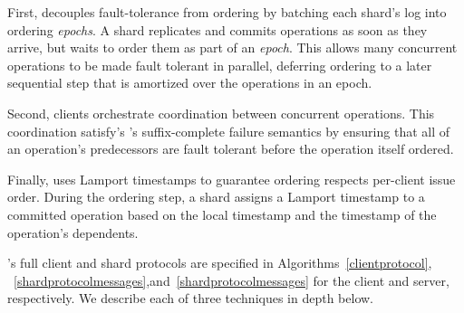 First, \sys{} decouples fault-tolerance from ordering by batching each shard's
log into ordering \textit{epochs}. A \sys{} shard replicates and commits
operations as soon as they arrive, but waits to order them as part of an
\textit{epoch}. This allows many concurrent operations to be made fault tolerant
in parallel, deferring ordering to a later sequential step that is amortized
over the operations in an epoch.

Second, \sys{} clients orchestrate coordination between concurrent operations.
This coordination satisfy's \MDL{}'s suffix-complete failure semantics by
ensuring that all of an operation's predecessors are fault tolerant before the
operation itself ordered.



Finally, \sys{} uses Lamport timestamps to guarantee ordering respects
per-client issue order. During the ordering step, a shard assigns a
Lamport timestamp to a committed operation based on the local
timestamp and the timestamp of the operation's dependents.

\sys{}'s full client and shard protocols are specified in
Algorithms~\ref{clientprotocol}, ~\ref{shardprotocolmessages},and~\ref{shardprotocolmessages} for the client and
server, respectively. We describe each of three techniques in depth below.



